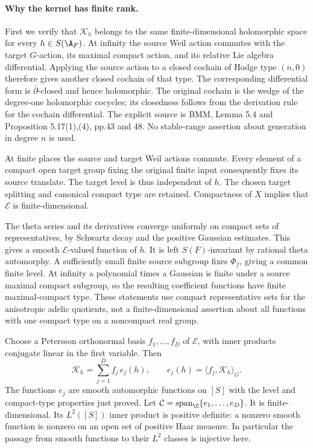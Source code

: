 \documentclass[11pt]{article}
\theoremstyle{definition}\newtheorem{definition}[theorem]{Definition}\newtheorem{remark}[theorem]{Remark}
\begin{document}
\paragraph{Why the kernel has finite rank.}
First we verify that $\mathcal K_h$ belongs to the same
finite-dimensional holomorphic space for every $h\in S(\A_F)$.
At infinity the source Weil action commutes with the target
$G$-action, its maximal compact action, and its relative Lie
algebra differential. Applying the source action to a closed
cochain of Hodge type $(n,0)$ therefore gives another closed
cochain of that type. The corresponding differential form is
$\bar\partial$-closed and hence holomorphic. The original cochain
is the wedge of the degree-one holomorphic cocycles; its
closedness follows from the derivation rule for the cochain
differential. The explicit source is BMM, Lemma 5.4 and
Proposition 5.17(1),(4), pp.43 and 48. No stable-range assertion
about generation in degree $n$ is used.

At finite places the source and target Weil actions commute.
Every element of a compact open target group fixing the original
finite input consequently fixes its source translate. The target
level is thus independent of $h$. The chosen target splitting
and canonical compact type are retained. Compactness of $X$
implies that $\mathcal E$ is finite-dimensional.

The theta series and its derivatives converge uniformly on compact
sets of representatives, by Schwartz decay and the positive
Gaussian estimates. This gives a smooth $\mathcal E$-valued
function of $h$. It is left $S(F)$-invariant by rational theta
automorphy. A sufficiently small finite source subgroup fixes
$\Phi_f$, giving a common finite level. At infinity a polynomial
times a Gaussian is finite under a source maximal compact
subgroup, so the resulting coefficient functions have finite
maximal-compact type. These statements use compact representative
sets for the anisotropic adelic quotients, not a finite-dimensional
assertion about all functions with one compact type on a
noncompact real group.

Choose a Petersson orthonormal basis
$f_1,\ldots,f_D$ of $\mathcal E$, with inner products conjugate
linear in the first variable. Then
\begin{equation}\label{A7-kernel}
 \mathcal K_h=\sum_{j=1}^D f_j\,e_j(h),
 \qquad e_j(h)=\langle f_j,\mathcal K_h\rangle_G .
\end{equation}
The functions $e_j$ are smooth automorphic functions on $[S]$
with the level and compact-type properties just proved.
Let $\mathcal C=\operatorname{span}_{\C}\{e_1,\ldots,e_D\}$.
It is finite-dimensional. Its $L^2([S])$ inner product is positive
definite: a nonzero smooth function is nonzero on an open set
of positive Haar measure. In particular the passage from smooth
functions to their $L^2$ classes is injective here.
\end{document}
